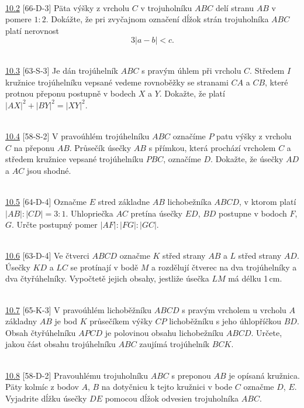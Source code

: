 \\

\noindent \ul{10.2} [66-D-3]
Päta výšky z vrcholu $C$ v trojuholníku $ABC$ delí stranu $AB$ v pomere $1 : 2$. Dokážte, že pri zvyčajnom označení dĺžok strán trojuholníka $ABC$ platí nerovnost $$3|a - b| < c.$$

\\

\noindent \ul{10.3} [63-S-3] Je dán trojúhelník $ABC$ s pravým úhlem při vrcholu
$C$. Středem $I$ kružnice trojúhelníku vepsané vedeme rovnoběžky se stranami
$CA$ a $CB$, které protnou přeponu postupně v bodech $X$ a $Y$. Dokažte, že
platí $|AX|^2 + |BY |^2 = |XY |^2$.


\\

\noindent \ul{10.4} [58-S-2] V pravoúhlém trojúhelníku $ABC$ označíme $P$ patu výšky z vrcholu $C$
 na přeponu $AB$. Průsečík úsečky $AB$ s přímkou, která prochází vrcholem $C$ a středem kružnice
 vepsané trojúhelníku $PBC$, označíme $D$. Dokažte, že úsečky $AD$ a $AC$ jsou shodné.


\\

\noindent \ul{10.5} [64-D-4] Označme $E$ stred základne $AB$ lichobežníka $ABCD$, v ktorom platí $|AB| : |CD| = 3 : 1$. Uhlopriečka $AC$ pretína úsečky $ED$, $BD$ postupne v bodoch $F$, $G$. Určte postupný pomer $|AF| : |FG| : |GC|$.


\\

\noindent \ul{10.6} [63-D-4] Ve čtverci $ABCD$ označme $K$ střed strany $AB$ a
$L$ střed strany $AD$. Úsečky $KD$ a $LC$ se protínají v bodě $M$ a rozdělují
čtverec na dva trojúhelníky a dva čtyřúhelníky. Vypočtetě jejich obsahy,
jestliže úsečka $LM$ má délku 1\,cm.

\\

\noindent \ul{10.7} [65-K-3] V pravoúhlém lichoběžníku $ABCD$ s pravým vrcholem
u vrcholu $A$ základny $AB$ je bod $K$ průsečíkem výšky $CP$ lichoběžníku s
jeho úhlopříčkou $BD$. Obsah čtyřúhelníku $APCD$ je polovinou obsahu
lichobežníku $ABCD$. Určete, jakou část obsahu trojúhelníku $ABC$ zaujímá
trojúhelník $BCK$.


\\

\noindent \ul{10.8} [58-D-2] Pravouhlému trojuholníku $ABC$ s preponou $AB$ je opísaná kružnica. Päty kolmíc z bodov $A$, $B$ na dotyčnicu k tejto kružnici v bode $C$ označme $D$, $E$. Vyjadrite dĺžku úsečky $DE$ pomocou dĺžok odvesien trojuholníka $ABC$.


